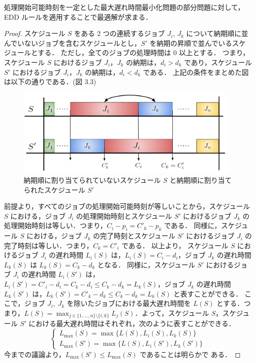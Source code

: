 \documentclass[12pt]{optlab-bachelor}
\begin{document}
\begin{lemma}\label{l_5}
  処理開始可能時刻を一定とした最大遅れ時間最小化問題の部分問題に対して，EDD ルールを適用することで最適解が求まる．
\end{lemma}

\begin{proof}
  スケジュール $S$ をある 2 つの連続するジョブ $J_i$, $J_k$ について納期順に並んでいないジョブを含むスケジュールとし，$S'$ を納期の昇順で並んでいるスケジュールとする．
  ただし，全てのジョブの処理時間は 0 以上とする．
  つまり，スケジュール $S$ におけるジョブ $J_i$，$J_k$ の納期は，$d_i > d_k$ であり，スケジュール $S'$ におけるジョブ $J_i$，$J_k$ の納期は，$d_i < d_k$ である．
  上記の条件をまとめた図は以下の通りである．(図 3.3)

  \begin{figure}[h]
    \centering
    \includegraphics[width = 11cm]{figure/EDDrule.pdf}
    \caption{納期順に割り当てられていないスケジュール $S$ と納期順に割り当てられたスケジュール $S'$}
  \end{figure}

  前提より，すべてのジョブの処理開始可能時刻が等しいことから，スケジュール $S$ における，ジョブ $J_i$ の処理開始時刻とスケジュール $S'$ におけるジョブ $J_k$ の処理開始時刻は等しい．つまり，$C_i - p_i = C'_k - p_k$ である．
  同様に，スケジュール $S$ における，ジョブ $J_k$ の完了時刻とスケジュール $S'$ におけるジョブ $J_i$ の完了時刻は等しい．つまり，$C_k = C'_i$ である．
  以上より，
  スケジュール $S$ におけるジョブ $J_i$ の遅れ時間 $L_i(S)$ は，$L_i(S) = C_i - d_i$，ジョブ $J_k$ の遅れ時間 $L_k(S)$ は $L_k(S) = C_k - d_k$ となる．
  同様に，スケジュール $S'$ におけるジョブ $J_i$ の遅れ時間 $L_i(S')$ は，$L_i(S') = C'_i - d_i = C_k - d_i \le C_k - d_k = L_k(S)$，ジョブ $J_k$ の遅れ時間 $L_k(S')$ は，$L_k(S') = C'_k - d_k \le C_k - d_k = L_k(S)$ と表すことができる．
  ここで，ジョブ $J_i,\ J_k$ を除いたジョブにおける最大遅れ時間を $L(S)$
  とする．つまり，$L(S) = \displaystyle \max_{j \in \{1,\ldots,n\}
  \setminus \{i,k\}}L_j(S)$．よって，スケジュール $S$，スケジュール
  $S'$ における最大遅れ時間はそれぞれ，次のように表すことができる．
  $$\left\{ \begin{array}{lll} L_{\max}(S) =
  \max\bigg\{L(S),L_i(S),L_k(S)\bigg\} \\ L_{\max}(S') =
  \max\bigg\{L(S),L_i(S'),L_k(S')\bigg\}\end{array} \right.$$
  今までの議論より，$L_{\max}(S') \le L_{\max}(S)$ であることは明らかで
  ある．


\end{proof}
\end{document}
